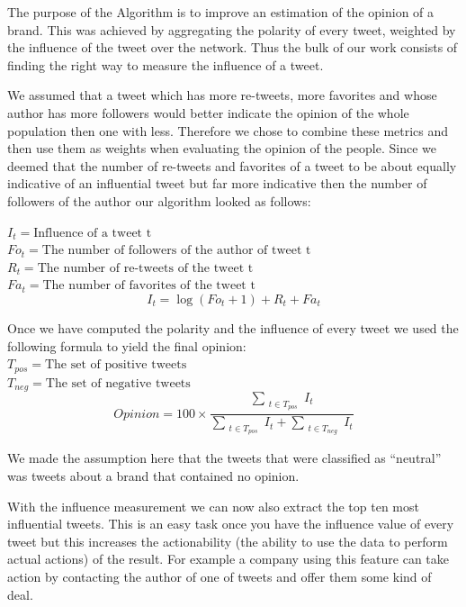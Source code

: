 \documentclass[a4paper,12pt]{report}
\begin{document}
The purpose of the Algorithm is to improve an estimation of the opinion of a brand. 
This was achieved by aggregating the polarity of every tweet, weighted by the influence of the tweet over the network.
Thus the bulk of our work consists of finding the right way to measure the influence of a tweet.

We assumed that a tweet which has more re-tweets, more favorites and whose author has more followers would better indicate the opinion of the whole population then one with less. Therefore we chose to combine these metrics and then use them as weights when evaluating the opinion of the people. Since we deemed that the number of re-tweets and favorites of a tweet to be about equally indicative of an influential tweet but far more indicative then the number of followers of the author our algorithm looked as follows:

$I_t = \text{Influence of a tweet t}$\\
$Fo_t = \text{The number of followers of the author of tweet t}$\\
$R_t = \text{The number of re-tweets of the tweet t}$\\
$Fa_t = \text{The number of favorites of the tweet t}$\\
\begin{equation}
I_t = \log (Fo_t + 1) + R_t + Fa_t
\end{equation}

Once we have computed the polarity and the influence of every tweet we used the following formula to yield the final opinion:\\
$T_{pos} = \text{The set of positive tweets}$\\
$T_{neg} = \text{The set of negative tweets}$\\
\begin{equation}
Opinion = 100 \times \frac{\sum_{\substack{t \in T_{pos}}} I_t}{\sum_{\substack{t \in T_{pos}}} I_t + \sum_{\substack{t \in T_{neg}}} I_t}
\end{equation}

We made the assumption here that the tweets that were classified as ``neutral'' was tweets about a brand that contained no opinion.

With the influence measurement we can now also extract the top ten most influential tweets. This is an easy task once you have the influence value of every tweet but this increases the actionability (the ability to use the data to perform actual actions) of the result. For example a company using this feature can take action by contacting the author of one of tweets and offer them some kind of deal.
\end{document}
